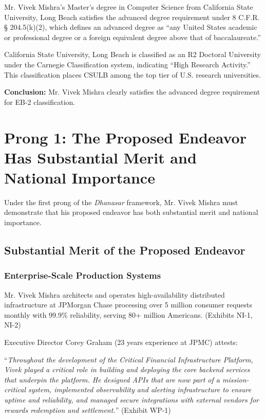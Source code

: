 \documentclass[11pt]{article}
\newcommand{\say}[1]{``#1''}
\newcommand{\dr}{Mr. Vivek Mishra }
\newcommand{\drs}{Mr. Vivek Mishra's }
\newcommand{\qu}[1]{\say{\emph{#1}}}
\begin{document}
\drs Master's degree in Computer Science from California State University, Long Beach satisfies the advanced degree requirement under 8 C.F.R. § 204.5(k)(2), which defines an advanced degree as ``any United States academic or professional degree or a foreign equivalent degree above that of baccalaureate.''

California State University, Long Beach is classified as an R2 Doctoral University under the Carnegie Classification system, indicating ``High Research Activity.'' This classification places CSULB among the top tier of U.S. research universities.

\textbf{Conclusion:} \dr clearly satisfies the advanced degree requirement for EB-2 classification.

\pagebreak


\section{Prong 1: The Proposed Endeavor Has Substantial Merit and National Importance}
\label{sec:prong1}

Under the first prong of the \textit{Dhanasar} framework, \dr must demonstrate that his proposed endeavor has both substantial merit and national importance.

\subsection{Substantial Merit of the Proposed Endeavor}

\subsubsection{Enterprise-Scale Production Systems}

\dr architects and operates high-availability distributed infrastructure at JPMorgan Chase processing over 5 million consumer requests monthly with 99.9\% reliability, serving 80+ million Americans. (Exhibits NI-1, NI-2)

Executive Director Corey Graham (23 years experience at JPMC) attests:

\qu{Throughout the development of the Critical Financial Infrastructure Platform, Vivek played a critical role in building and deploying the core backend services that underpin the platform. He designed APIs that are now part of a mission-critical system, implemented observability and alerting infrastructure to ensure uptime and reliability, and managed secure integrations with external vendors for rewards redemption and settlement.} (Exhibit WP-1)
\end{document}
